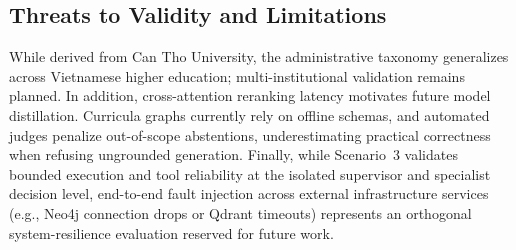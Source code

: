 \subsection{Threats to Validity and Limitations}
\label{sec:limitations}

While derived from Can Tho University, the administrative taxonomy generalizes across Vietnamese higher education; multi-institutional validation remains planned. In addition, cross-attention reranking latency motivates future model distillation. Curricula graphs currently rely on offline schemas, and automated judges penalize out-of-scope abstentions, underestimating practical correctness when refusing ungrounded generation. Finally, while Scenario~3 validates bounded execution and tool reliability at the isolated supervisor and specialist decision level, end-to-end fault injection across external infrastructure services (e.g., Neo4j connection drops or Qdrant timeouts) represents an orthogonal system-resilience evaluation reserved for future work.
